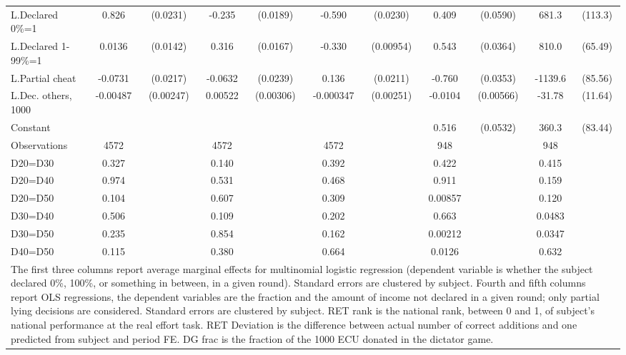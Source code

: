 \begin{tabular}{l|cccccc|cc|cc}
L.Declared 0\%=1&    0.826\sym{***}& (0.0231)&   -0.235\sym{***}& (0.0189)&   -0.590\sym{***}& (0.0230)&    0.409\sym{***}& (0.0590)&    681.3\sym{***}&  (113.3)\\
L.Declared 1-99\%=1&   0.0136         & (0.0142)&    0.316\sym{***}& (0.0167)&   -0.330\sym{***}&(0.00954)&    0.543\sym{***}& (0.0364)&    810.0\sym{***}&  (65.49)\\
L.Partial cheat &  -0.0731\sym{***}& (0.0217)&  -0.0632\sym{***}& (0.0239)&    0.136\sym{***}& (0.0211)&   -0.760\sym{***}& (0.0353)&  -1139.6\sym{***}&  (85.56)\\
L.Dec. others, 1000& -0.00487\sym{**} &(0.00247)&  0.00522\sym{*}  &(0.00306)&-0.000347         &(0.00251)&  -0.0104\sym{*}  &(0.00566)&   -31.78\sym{***}&  (11.64)\\
Constant        &                  &         &                  &         &                  &         &    0.516\sym{***}& (0.0532)&    360.3\sym{***}&  (83.44)\\
\hline
Observations    &     4572         &         &     4572         &         &     4572         &         &      948         &         &      948         &         \\
D20=D30         &    0.327         &         &    0.140         &         &    0.392         &         &    0.422         &         &    0.415         &         \\
D20=D40         &    0.974         &         &    0.531         &         &    0.468         &         &    0.911         &         &    0.159         &         \\
D20=D50         &    0.104         &         &    0.607         &         &    0.309         &         &  0.00857         &         &    0.120         &         \\
D30=D40         &    0.506         &         &    0.109         &         &    0.202         &         &    0.663         &         &   0.0483         &         \\
D30=D50         &    0.235         &         &    0.854         &         &    0.162         &         &  0.00212         &         &   0.0347         &         \\
D40=D50         &    0.115         &         &    0.380         &         &    0.664         &         &   0.0126         &         &    0.632         &         \\
\hline\hline
\multicolumn{11}{p{18cm}}{\tiny The first three columns report average marginal effects for multinomial logistic regression (dependent variable is whether the subject declared 0\%, 100\%, or something in between, in a given round). Standard errors are clustered by subject. Fourth and fifth columns report OLS regressions, the dependent variables are the fraction and the amount of income not declared in a given round; only partial lying decisions are considered. Standard errors are clustered by subject. RET rank is the national rank, between 0 and 1, of subject's national performance at the real effort task. RET Deviation is the difference between actual number of correct additions and one predicted from subject and period FE. DG frac is the fraction of the 1000 ECU donated in the dictator game.}\\

\end{tabular}
